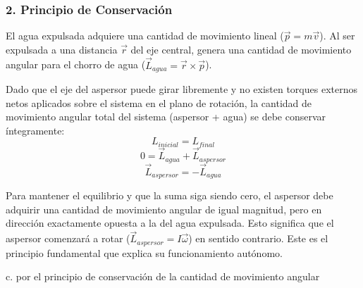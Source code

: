 \documentclass[12pt, a4paper]{article}
\begin{document}
\subsubsection*{2. Principio de Conservación}
El agua expulsada adquiere una cantidad de movimiento lineal ($\vec{p} = m\vec{v}$). Al ser expulsada a una distancia $\vec{r}$ del eje central, genera una cantidad de movimiento angular para el chorro de agua ($\vec{L}_{agua} = \vec{r} \times \vec{p}$).

Dado que el eje del aspersor puede girar libremente y no existen torques externos netos aplicados sobre el sistema en el plano de rotación, la cantidad de movimiento angular total del sistema (aspersor + agua) se debe conservar íntegramente:
$$L_{inicial} = L_{final}$$
$$0 = \vec{L}_{agua} + \vec{L}_{aspersor}$$
$$\vec{L}_{aspersor} = -\vec{L}_{agua}$$

Para mantener el equilibrio y que la suma siga siendo cero, el aspersor debe adquirir una cantidad de movimiento angular de igual magnitud, pero en dirección exactamente opuesta a la del agua expulsada. Esto significa que el aspersor comenzará a rotar ($\vec{L}_{aspersor} = I \vec{\omega}$) en sentido contrario. Este es el principio fundamental que explica su funcionamiento autónomo.

\begin{tcolorbox}[colback=green!5!white, colframe=green!50!black, title=Respuesta Correcta]
\centering \Large c. por el principio de conservación de la cantidad de movimiento angular
\end{tcolorbox}
\end{document}
